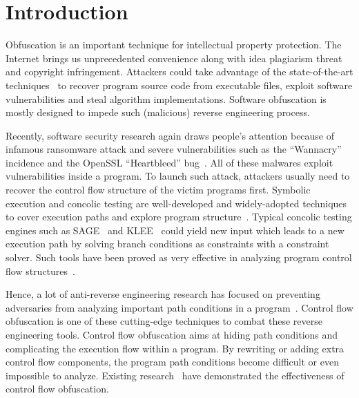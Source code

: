 \documentclass[lnicst]{svmultln}
\begin{document}

\section{Introduction}
\label{sec:introduction}
Obfuscation is an important technique for intellectual property protection. The
Internet brings us unprecedented convenience along with idea plagiarism threat
and copyright infringement. Attackers could take advantage of the
state-of-the-art techniques~\cite{Loop,Lee,Molnar} to recover program source
code from executable files, exploit software vulnerabilities and steal algorithm
implementations. Software obfuscation is mostly designed to impede such
(malicious) reverse engineering process.

Recently, software security research again draws people's attention because of
infamous ransomware attack and severe vulnerabilities such as the ``Wannacry''
incidence and the OpenSSL ``Heartbleed'' bug~\cite{Heartbleed,wannacry}. All of
these malwares exploit vulnerabilities inside a program. To launch such attack,
attackers usually need to recover the control flow structure of the victim
programs first. Symbolic execution and concolic testing are well-developed and
widely-adopted techniques to cover execution paths and explore program
structure~\cite{dart,exe,Sen,symbol}. Typical concolic testing engines such as
SAGE~\cite{Sage} and KLEE~\cite{klee} could yield new input which leads to a new
execution path by solving branch conditions as constraints with a constraint
solver. Such tools have been proved as very effective in analyzing program
control flow structures~\cite{Cute}.

Hence, a lot of anti-reverse engineering research has focused on preventing
adversaries from analyzing important path conditions in a
program~\cite{Opaque,Sharif,Popov,Zhi, Wang:Zhi}. Control flow obfuscation is
one of these cutting-edge techniques to combat these reverse engineering tools.
Control flow obfuscation aims at hiding path conditions and complicating the
execution flow within a program. By rewriting or adding extra control flow
components, the program path conditions become difficult or even impossible to
analyze. Existing research~\cite{Ma} have demonstrated the effectiveness of
control flow obfuscation.

\end{document}
